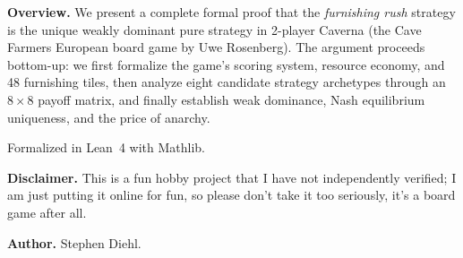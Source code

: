 
\textbf{Overview.}
We present a complete formal proof that the \emph{furnishing rush} strategy is
the unique weakly dominant pure strategy in 2-player Caverna (the Cave Farmers
European board game by Uwe Rosenberg).  The argument proceeds bottom-up: we
first formalize the game's scoring system, resource economy, and 48 furnishing
tiles, then analyze eight candidate strategy archetypes through an $8 \times 8$
payoff matrix, and finally establish weak dominance, Nash equilibrium
uniqueness, and the price of anarchy.

Formalized in Lean~4 with Mathlib.

\textbf{Disclaimer.} This is a fun hobby project that I have not independently
verified; I am just putting it online for fun, so please don't take it too
seriously, it's a board game after all.

\textbf{Author.} Stephen Diehl.













